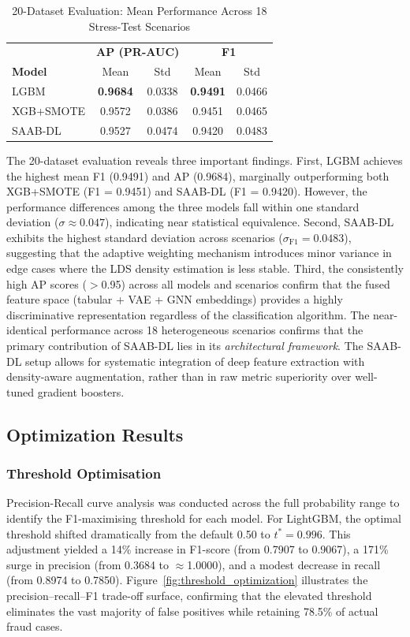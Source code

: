 \documentclass[a4paper,fleqn]{cas-sc}
\begin{document}
\begin{table}[H]
\centering
\caption{20-Dataset Evaluation: Mean Performance Across 18 Stress-Test Scenarios}
\label{tab:20dataset_summary}
\small
\begin{tabular}{@{}lcccc@{}}
\toprule
 & \multicolumn{2}{c}{\textbf{AP (PR-AUC)}} & \multicolumn{2}{c}{\textbf{F1}} \\
\textbf{Model} & Mean & Std & Mean & Std \\
\midrule
LGBM       & \textbf{0.9684} & 0.0338 & \textbf{0.9491} & 0.0466 \\
XGB+SMOTE  & 0.9572 & 0.0386 & 0.9451 & 0.0465 \\
SAAB-DL    & 0.9527 & 0.0474 & 0.9420 & 0.0483 \\
\bottomrule
\end{tabular}
\end{table}

The 20-dataset evaluation reveals three important findings. First, LGBM achieves the highest mean F1 (0.9491) and AP (0.9684), marginally outperforming both XGB+SMOTE (F1 = 0.9451) and SAAB-DL (F1 = 0.9420). However, the performance differences among the three models fall within one standard deviation ($\sigma \approx 0.047$), indicating near statistical equivalence. Second, SAAB-DL exhibits the highest standard deviation across scenarios ($\sigma_{\text{F1}} = 0.0483$), suggesting that the adaptive weighting mechanism introduces minor variance in edge cases where the LDS density estimation is less stable. Third, the consistently high AP scores ($>$0.95) across all models and scenarios confirm that the fused feature space (tabular + VAE + GNN embeddings) provides a highly discriminative representation regardless of the classification algorithm. The near-identical performance across 18 heterogeneous scenarios confirms that the primary contribution of SAAB-DL lies in its \emph{architectural framework}. The SAAB-DL setup allows for systematic integration of deep feature extraction with density-aware augmentation, rather than in raw metric superiority over well-tuned gradient boosters.

\subsection{Optimization Results}

\subsubsection{Threshold Optimisation}
Precision-Recall curve analysis was conducted across the full probability range to identify the F1-maximising threshold for each model. For LightGBM, the optimal threshold shifted dramatically from the default 0.50 to $t^* = 0.996$. This adjustment yielded a 14\% increase in F1-score (from 0.7907 to 0.9067), a 171\% surge in precision (from 0.3684 to $\approx$1.0000), and a modest decrease in recall (from 0.8974 to 0.7850). Figure~\ref{fig:threshold_optimization} illustrates the precision--recall--F1 trade-off surface, confirming that the elevated threshold eliminates the vast majority of false positives while retaining 78.5\% of actual fraud cases.
\end{document}
